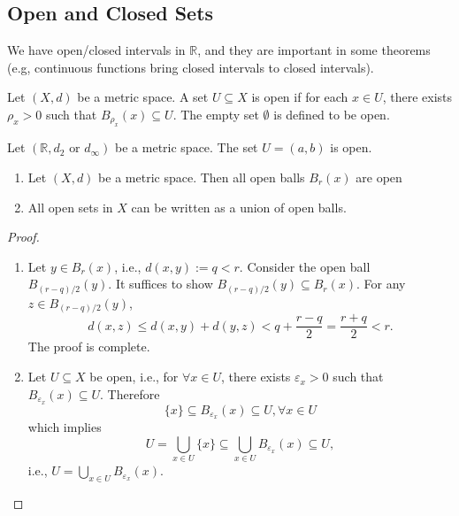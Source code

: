 \subsection{Open and Closed Sets}
We have open/closed intervals in $\mathbb{R}$, and they are important in some theorems (e.g, continuous functions bring closed intervals to closed intervals).
\begin{definition}[Open]
Let $(X,d)$ be a metric space.  A set $U\subseteq X$ is open if for each $x\in U$, there exists $\rho_x>0$ such that $B_{\rho_x}(x)\subseteq U$. The empty set $\emptyset$ is defined to be open.
\end{definition}
\begin{example}
Let $(\mathbb{R},d_2\mbox{ or }d_\infty)$ be a metric space. The set $U=(a,b)$ is open.
\end{example}
\begin{proposition}
\begin{enumerate}
\item
Let $(X,d)$ be a metric space. Then all open balls $B_r(x)$ are open
\item
All open sets in $X$ can be written as a union of open balls.
\end{enumerate}
\end{proposition}
\begin{proof}
\begin{enumerate}
\item
Let $y\in B_r(x)$, i.e., $d(x,y):=q<r$. Consider the open ball $B_{(r-q)/2}(y)$. It suffices to show $B_{(r-q)/2}(y)\subseteq B_r(x)$. For any $z\in B_{(r-q)/2}(y)$,
\[
d(x,z)\le d(x,y)+d(y,z)<q+\frac{r-q}{2}=\frac{r+q}{2}<r.
\]
The proof is complete.
\item
Let $U\subseteq X$ be open, i.e., for $\forall x\in U$, there exists $\varepsilon_x>0$ such that $B_{\varepsilon_x}(x)\subseteq U$. Therefore
\[
\{x\}\subseteq B_{\varepsilon_x}(x)\subseteq U,\forall x\in U
\]
which implies
\[
U=\bigcup_{x\in U}\{x\}\subseteq \bigcup_{x\in U}B_{\varepsilon_x}(x)\subseteq U,
\]
i.e., $U=\bigcup_{x\in U}B_{\varepsilon_x}(x)$.
\end{enumerate}
\end{proof}
















